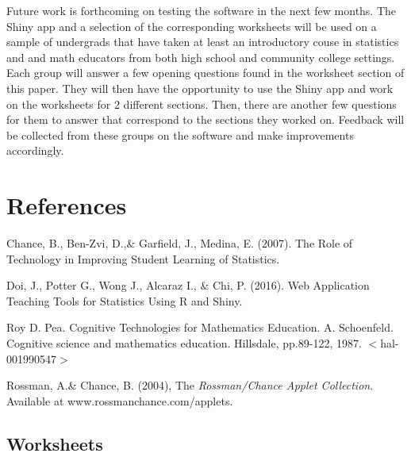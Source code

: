 \documentclass[11pt]{book}
\begin{document}
Future work is forthcoming on testing the software in the next few months. The Shiny app and a selection of the corresponding worksheets will be used on a sample of undergrads that have taken at least an introductory couse in statistics and and math educators from both high school and community college settings.  Each group  will answer a few opening questions found in the worksheet section of this paper. They will then have the opportunity to use the Shiny app and work on the worksheets for 2 different sections. Then, there are another few questions for them to answer that correspond to the sections they worked on.  Feedback will be collected from these groups on the software and make improvements accordingly.  


\section{References}


 \begin{thebibliography}{9}

  Chance, B., Ben-Zvi, D.,$\&$ Garfield, J.,  Medina, E. (2007). The Role of Technology in Improving Student Learning of Statistics.

  Doi, J., Potter G., Wong J., Alcaraz I., $\&$ Chi, P. (2016). Web Application Teaching Tools for Statistics Using R and Shiny. 

 Roy D. Pea. Cognitive Technologies for Mathematics Education. A. Schoenfeld. Cognitive science and mathematics education. Hillsdale, pp.89-122, 1987. $<$hal-001990547$>$

 Rossman, A.$\&$ Chance, B. (2004), The \emph{Rossman/Chance Applet Collection}. Available at www.rossmanchance.com/applets.


  \end{thebibliography}



\subsection{Worksheets}
\end{document}
